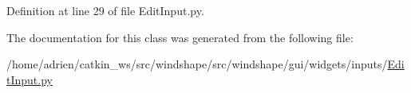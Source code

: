 Definition at line 29 of file Edit\+Input.\+py.



The documentation for this class was generated from the following file\+:\begin{DoxyCompactItemize}
\item 
/home/adrien/catkin\+\_\+ws/src/windshape/src/windshape/gui/widgets/inputs/\mbox{\hyperlink{_edit_input_8py}{Edit\+Input.\+py}}\end{DoxyCompactItemize}
